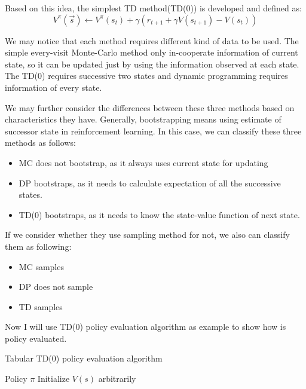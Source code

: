 \documentclass[officiallayout]{tktla}
\begin{document}
Based on this idea, the simplest TD method(TD(0)) is developed and defined as:
\begin{equation}
V^\pi(\vec{s}) \leftarrow V^\pi(s_t) + \gamma (r_{t+1} + \gamma V(s_{t+1})- V(s_t))
\end{equation}

We may notice that each method requires different kind of data to be used. The simple every-visit Monte-Carlo method only in-cooperate information of current state, so it can be updated just by using the information observed at each state. The TD(0) requires successive two states and dynamic programming requires information of every state.

We may further consider the differences between these three methods based on characteristics they have. Generally, bootstrapping means using estimate of successor state in reinforcement learning. In this case, we can classify these three methods as follows:
\begin{itemize}
\item MC does not bootstrap, as it always uses current state for updating
\item DP bootstraps, as it needs to calculate expectation of all the successive states.
\item TD(0) bootstraps, as it needs to know the state-value function of next state.
\end{itemize}
If we consider whether they use sampling method for not, we also can classify them as following:
\begin{itemize}
\item MC samples
\item DP does not sample
\item TD samples
\end{itemize}

Now I will use TD(0) policy evaluation algorithm as example to show how is policy evaluated.
\newline
\newline
\begin{algorithm}[t]
\caption{Tabular TD(0) policy evaluation algorithm}
\label{algo:adam}
\begin{algorithmic}
 \REQUIRE Policy $\pi$
 Initialize $V(s)$ arbitrarily \;
\end{algorithmic}
\vspace{-0.05in}
\end{algorithm}
\end{document}
